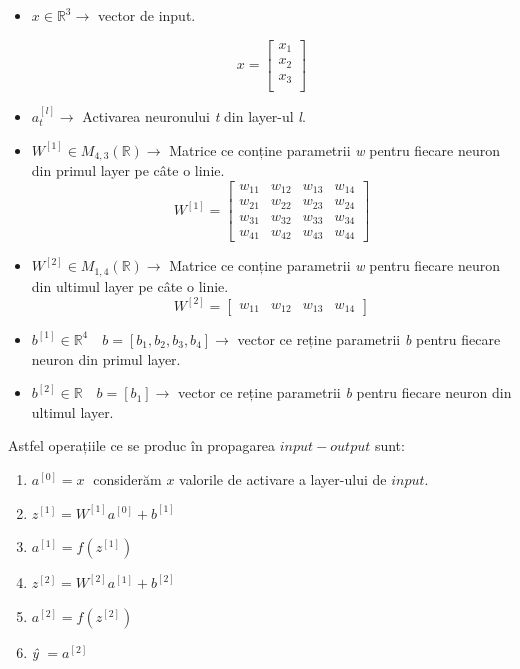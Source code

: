 \begin{itemize}
\item $x \in \mathbb{R}^3 \rightarrow$ vector de input.

\[
x=
\begin{bmatrix}
x_1 \\
x_2 \\
x_3 \\
\end{bmatrix}
\]
 
\item $a_t^{[l]} \rightarrow$ Activarea neuronului \textit{t} din layer-ul \textit{l}.
\item $W^{[1]} \in M_{4,3}(\mathbb{R}) \rightarrow$ Matrice ce conține parametrii \textit{w} pentru fiecare neuron din primul layer pe câte o linie. \\

\[
W^{[1]}=
\begin{bmatrix}
    w_{11} & w_{12} & w_{13} & w_{14} \\
    w_{21} & w_{22} & w_{23} & w_{24} \\
    w_{31} & w_{32} & w_{33} & w_{34} \\
    w_{41} & w_{42} & w_{43} & w_{44}
\end{bmatrix}
\]

\item $W^{[2]} \in M_{1,4}(\mathbb{R}) \rightarrow$ Matrice ce conține parametrii \textit{w} pentru fiecare neuron din ultimul layer pe câte o linie. \\

\[
W^{[2]}=
\begin{bmatrix}
    w_{11} & w_{12} & w_{13} & w_{14}
\end{bmatrix}
\]

\item $b^{[1]} \in \mathbb{R}^4 \quad b=[b_1,b_2,b_3,b_4] \rightarrow$ vector ce reține parametrii \textit{b} pentru fiecare neuron din primul layer.

\item $b^{[2]} \in \mathbb{R} \quad b=[b_1] \rightarrow$ vector ce reține parametrii \textit{b} pentru fiecare neuron din ultimul layer.
\end{itemize}

Astfel operațiile ce se produc în propagarea $input-output$ sunt:

\begin{enumerate}
\item $a^{[0]} = x \;$ considerăm $x$ valorile de activare a layer-ului de $input$.
\item $z^{[1]} = W^{[1]}a^{[0]} + b^{[1]}$
\item $a^{[1]} = f(z^{[1]})$
\item $z^{[2]} = W^{[2]}a^{[1]} + b^{[2]}$
\item $a^{[2]} = f(z^{[2]})$
\item \textit{\^{y}} $=a^{[2]}$
\end{enumerate}

